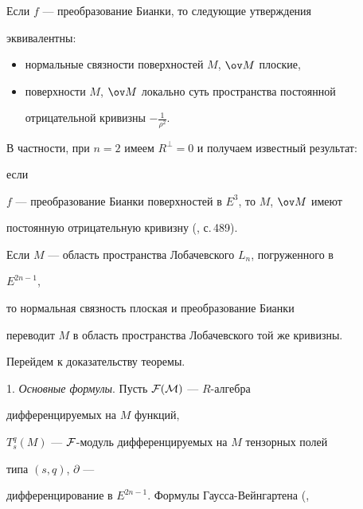 \begin{cor} Если $f$ --- преобразование Бианки, то следующие утверждения 


эквивалентны: 


\begin{itemize} 


\item[1)] нормальные связности поверхностей $M$, $\ov M$ плоские, 


\item[2)] поверхности $M$, $\ov M$ локально суть пространства постоянной 


отрицательной кривизны $-\frac{1}{\rho^2}$. 


\end{itemize} 


\end{cor} 


 


В частности, при $n=2$ имеем $R^\bot=0$ и получаем известный результат: 


если 


$f$ --- преобразование Бианки поверхностей в $E^3$, то $M$, $\ov M$ имеют 


постоянную отрицательную кривизну (\cite{Shu}, с.\,489). 


 


Если $M$ --- область пространства Лобачевского $L_n$, погруженного в 


$E^{2n-1}$, 


то \cite{Ami} нормальная связность плоская и преобразование Бианки 


\cite{Ami} 


переводит $M$ в область пространства Лобачевского той же кривизны. 


 


Перейдем к доказательству теоремы. 


\medskip 


 


1. {\it Основные формулы}. Пусть $\cal F(M)$ --- $R$-алгебра 


дифференцируемых на $M$ функций, 


$T^q_s(M)$ --- $\cal F$-модуль дифференцируемых на $M$ тензорных полей 


типа $(s,q)$, $\partial$ --- 


дифференцирование в $E^{2n-1}$. Формулы Гаусса-Вейнгартена (\cite{Kob}, 


